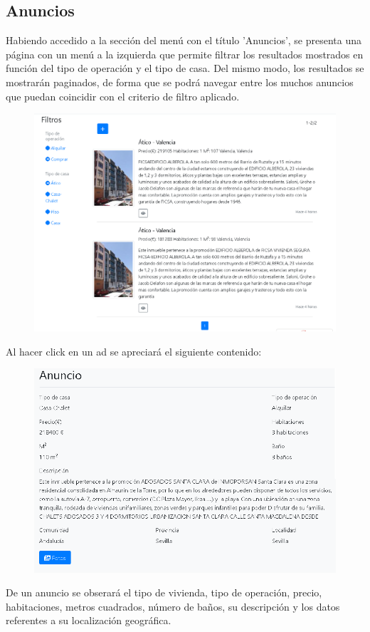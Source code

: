 \subsection{Anuncios}
Habiendo accedido a la secci\'{o}n del men\'{u} con el t\'{i}tulo 'Anuncios', se presenta una p\'{a}gina con un men\'{u} a la izquierda que permite filtrar los resultados mostrados en funci\'{o}n del tipo de operaci\'{o}n y el tipo de casa. Del mismo modo, los resultados se mostrar\'{a}n paginados, de forma que se podr\'{a} navegar entre los muchos anuncios que puedan coincidir con el criterio de filtro aplicado.

\begin{figure}[h!]
\centering
\includegraphics[width=.7\textwidth]{Img/ManualUsuario/LISTADO_ANUNCIOS.png}
\end{figure}


Al hacer click en un ad se apreciar\'{a} el siguiente contenido:

\begin{figure}[h!]
\centering
\includegraphics[width=.7\textwidth]{Img/ManualUsuario/ANUNCIO_GUEST.png}
\end{figure}

De un anuncio se obserar\'{a} el tipo de vivienda, tipo de operaci\'{o}n, precio, habitaciones, metros cuadrados, n\'{u}mero de ba\~{n}os, su descripci\'{o}n y los datos referentes a su localizaci\'{o}n geogr\'{a}fica.\\

